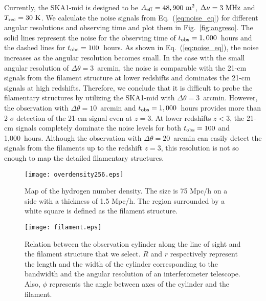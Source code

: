 \documentclass[a4paper,fleqn,usenatbib,useAMS]{mnras}
\begin{document}
Currently, the SKA1-mid is designed to be $A_{\rm{eff}}=48,900~\rm{m^{2}}$, $\Delta\nu=3~\rm{MHz}$ and
$T_{\rm{rec}}=30~\rm{K}$.
We calculate the noise signals from Eq.~(\ref{eq:noise_eq}) for
different angular resolutions and observing time
and plot them in Fig.~\ref{fig:angreso}.
The solid lines represent the noise for the observing time of $t_{\rm obs} = 1,000$~hours and the dashed lines for $t_{\rm obs} = 100$~hours.
As shown in Eq.~(\ref{eq:noise_eq}), the noise  increases as the
angular resolution becomes small. In the case with the small
angular resolution of $\Delta \theta =3$~arcmin, the noise is comparable
with the 21-cm signals from the filament structure at lower redshifts and dominates the 21-cm
signals at high redshifts.
Therefore, we conclude that it is difficult to probe the filamentary structures by utilizing the SKA1-mid with $\Delta \theta =3$~arcmin.
However, the observation with $\Delta \theta =10$~arcmin and $t_{\rm obs} = 1,000$~hours
provides more than 2 $\sigma$ detection of the 21-cm signal even at $z=3$. 
At lower redshifts $z<3$, the 21-cm signals completely dominate the
noise levels for both $t_{\rm obs} =100$ and 1,000~hours.
Although the observation with $\Delta
\theta=20$~arcmin can easily detect the signals from the filaments up to the
redshift $z=3$, this resolution is not so enough to map the detailed filamentary structures.
 
\begin{figure}
 \texttt{[image: overdensity256.eps]}
 \caption{Map of the hydrogen number density. The size is 75 Mpc/h on a side with a thickness of 1.5 Mpc/h. The region surrounded by a white square is defined as the filament structure.}
 \label{fig:overdensity256}
\end{figure}

\begin{figure}
 \texttt{[image: filament.eps]}
 \caption{Relation between the observation cylinder along  the line of sight and the filament structure that we select. $R$ and $r$ respectively represent the length and the width of the cylinder corresponding to the bandwidth and the angular resolution of an interferometer telescope. Also, $\phi$ represents the angle between axes of the cylinder and the filament.}
 \label{fig:filament}
\end{figure}
\end{document}
